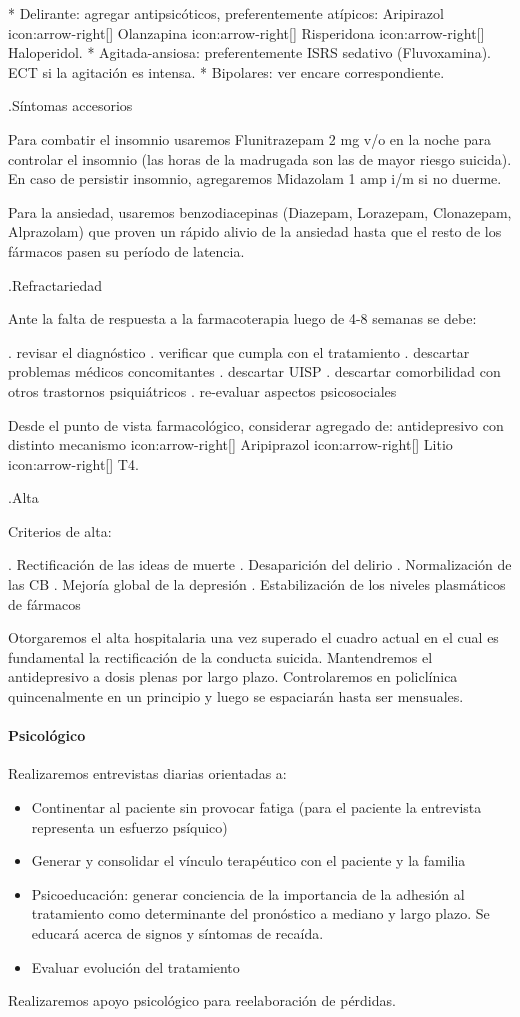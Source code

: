 * Delirante: agregar antipsicóticos, preferentemente atípicos: Aripirazol icon:arrow-right[] Olanzapina icon:arrow-right[] Risperidona icon:arrow-right[] Haloperidol.
* Agitada-ansiosa: preferentemente ISRS sedativo (Fluvoxamina). ECT si la agitación es intensa.
* Bipolares: ver encare correspondiente.

.Síntomas accesorios

Para combatir el insomnio usaremos Flunitrazepam 2 mg v/o en la noche para controlar el insomnio (las horas de la madrugada son las de mayor riesgo suicida). En caso de persistir insomnio, agregaremos Midazolam 1 amp i/m si no duerme.

Para la ansiedad, usaremos benzodiacepinas (Diazepam, Lorazepam, Clonazepam, Alprazolam) que proven un rápido alivio de la ansiedad hasta que el resto de los fármacos pasen su período de latencia.

.Refractariedad

Ante la falta de respuesta a la farmacoterapia luego de 4-8 semanas se debe:

. revisar el diagnóstico
. verificar que cumpla con el tratamiento
. descartar problemas médicos concomitantes
. descartar UISP
. descartar comorbilidad con otros trastornos psiquiátricos
. re-evaluar aspectos psicosociales

Desde el punto de vista farmacológico, considerar agregado de: antidepresivo con distinto mecanismo icon:arrow-right[] Aripiprazol icon:arrow-right[] Litio icon:arrow-right[] T4.

.Alta

Criterios de alta:

. Rectificación de las ideas de muerte
. Desaparición del delirio
. Normalización de las CB
. Mejoría global de la depresión
. Estabilización de los niveles plasmáticos de fármacos

Otorgaremos el alta hospitalaria una vez superado el cuadro actual en el cual es fundamental la rectificación de la conducta suicida. Mantendremos el antidepresivo a dosis plenas por largo plazo. Controlaremos en policlínica quincenalmente en un principio y luego se espaciarán hasta ser mensuales.
\paragraph{Psicológico}
Realizaremos entrevistas diarias orientadas a:

\begin{itemize}
	\item Continentar al paciente sin provocar fatiga (para el paciente la entrevista representa un esfuerzo psíquico)
	\item Generar y consolidar el vínculo terapéutico con el paciente y la familia
	\item Psicoeducación: generar conciencia de la importancia de la adhesión al tratamiento como determinante del pronóstico a mediano y largo plazo. Se educará acerca de signos y síntomas de recaída.
	\item Evaluar evolución del tratamiento
\end{itemize}
Realizaremos apoyo psicológico para reelaboración de pérdidas.

